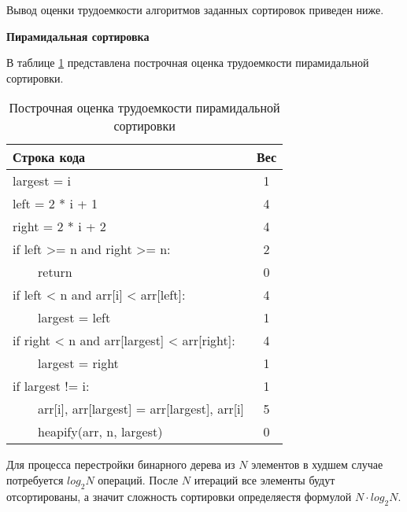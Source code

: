 Вывод оценки трудоемкости алгоритмов заданных сортировок приведен ниже.

    \textbf{Пирамидальная сортировка}
    
    В таблице \ref{tbl:heap_weight} представлена построчная оценка трудоемкости пирамидальной сортировки.
    \begin{table}[h]
    \begin{center}
        \begin{threeparttable}
        \captionsetup{}
        \caption{\label{tbl:heap_weight}Построчная оценка трудоемкости пирамидальной сортировки}
        \begin{tabular}{|l|c|}
            \hline
            Строка кода & Вес \\
            \hline
            largest = i & 1 \\ 
            \hline
            left = 2 * i + 1 & 4 \\ 
            \hline
            right = 2 * i + 2 & 4 \\ 
            \hline
            if left >= n and right >= n: & 2 \\ 
            \hline
            ~~~~return & 0 \\ 
            \hline
            if left < n and arr[i] < arr[left]: & 4 \\ 
            \hline
            ~~~~largest = left & 1 \\ 
            \hline
            if right < n and arr[largest] < arr[right]: & 4 \\ 
            \hline
            ~~~~largest = right & 1 \\ 
            \hline
            if largest != i: & 1 \\ 
            \hline
            ~~~~arr[i], arr[largest] = arr[largest], arr[i] & 5 \\ 
            \hline
            ~~~~heapify(arr, n, largest) & 0 \\ 
            \hline
		\end{tabular}
        \end{threeparttable}
    \end{center}
    \end{table}

    \FloatBarrier
    
    Для процесса перестройки бинарного дерева  из $N$ элементов в худшем случае потребуется $log_2 N$ операций. После $N$ итераций все элементы будут отсортированы, а значит сложность сортировки определяестя формулой $N \cdot log_2 N$.
    
